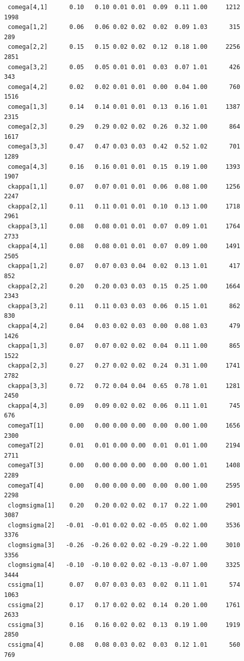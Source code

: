 \documentclass[
]{article}
\begin{document}
\begin{verbatim}
 comega[4,1]      0.10   0.10 0.01 0.01  0.09  0.11 1.00     1212     1998
 comega[1,2]      0.06   0.06 0.02 0.02  0.02  0.09 1.03      315      289
 comega[2,2]      0.15   0.15 0.02 0.02  0.12  0.18 1.00     2256     2851
 comega[3,2]      0.05   0.05 0.01 0.01  0.03  0.07 1.01      426      343
 comega[4,2]      0.02   0.02 0.01 0.01  0.00  0.04 1.00      760     1516
 comega[1,3]      0.14   0.14 0.01 0.01  0.13  0.16 1.01     1387     2315
 comega[2,3]      0.29   0.29 0.02 0.02  0.26  0.32 1.00      864     1617
 comega[3,3]      0.47   0.47 0.03 0.03  0.42  0.52 1.02      701     1289
 comega[4,3]      0.16   0.16 0.01 0.01  0.15  0.19 1.00     1393     1907
 ckappa[1,1]      0.07   0.07 0.01 0.01  0.06  0.08 1.00     1256     2247
 ckappa[2,1]      0.11   0.11 0.01 0.01  0.10  0.13 1.00     1718     2961
 ckappa[3,1]      0.08   0.08 0.01 0.01  0.07  0.09 1.01     1764     2733
 ckappa[4,1]      0.08   0.08 0.01 0.01  0.07  0.09 1.00     1491     2505
 ckappa[1,2]      0.07   0.07 0.03 0.04  0.02  0.13 1.01      417      852
 ckappa[2,2]      0.20   0.20 0.03 0.03  0.15  0.25 1.00     1664     2343
 ckappa[3,2]      0.11   0.11 0.03 0.03  0.06  0.15 1.01      862      830
 ckappa[4,2]      0.04   0.03 0.02 0.03  0.00  0.08 1.03      479     1426
 ckappa[1,3]      0.07   0.07 0.02 0.02  0.04  0.11 1.00      865     1522
 ckappa[2,3]      0.27   0.27 0.02 0.02  0.24  0.31 1.00     1741     2782
 ckappa[3,3]      0.72   0.72 0.04 0.04  0.65  0.78 1.01     1281     2450
 ckappa[4,3]      0.09   0.09 0.02 0.02  0.06  0.11 1.01      745      676
 comegaT[1]       0.00   0.00 0.00 0.00  0.00  0.00 1.00     1656     2300
 comegaT[2]       0.01   0.01 0.00 0.00  0.01  0.01 1.00     2194     2711
 comegaT[3]       0.00   0.00 0.00 0.00  0.00  0.00 1.01     1408     2289
 comegaT[4]       0.00   0.00 0.00 0.00  0.00  0.00 1.00     2595     2298
 clogmsigma[1]    0.20   0.20 0.02 0.02  0.17  0.22 1.00     2901     3087
 clogmsigma[2]   -0.01  -0.01 0.02 0.02 -0.05  0.02 1.00     3536     3376
 clogmsigma[3]   -0.26  -0.26 0.02 0.02 -0.29 -0.22 1.00     3010     3356
 clogmsigma[4]   -0.10  -0.10 0.02 0.02 -0.13 -0.07 1.00     3325     3444
 cssigma[1]       0.07   0.07 0.03 0.03  0.02  0.11 1.01      574     1063
 cssigma[2]       0.17   0.17 0.02 0.02  0.14  0.20 1.00     1761     2633
 cssigma[3]       0.16   0.16 0.02 0.02  0.13  0.19 1.00     1919     2850
 cssigma[4]       0.08   0.08 0.03 0.02  0.03  0.12 1.01      560      769
\end{verbatim}

\newpage{}
\end{document}
